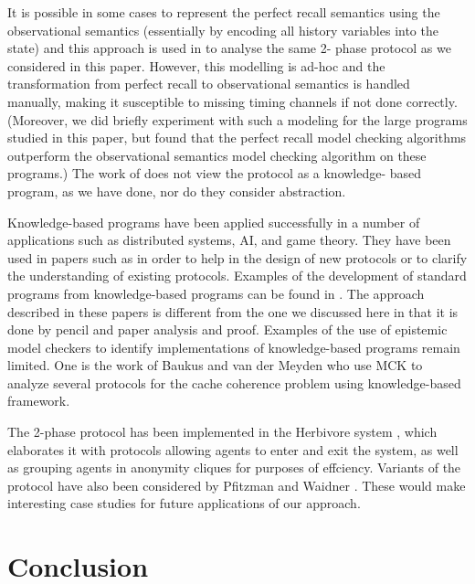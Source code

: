 \documentclass[]{llncs}
\begin{document}
It is possible in some cases to represent the perfect
recall semantics using the observational semantics (essentially by  
encoding all history variables into the
state) and this approach is used in \cite{LSGWY} to analyse the same 2- 
phase protocol as
we considered in this paper.
However, this modelling is ad-hoc and the transformation from perfect  
 recall to observational semantics is
handled manually, making it susceptible to missing timing channels if  
not done correctly.
(Moreover, we did briefly experiment with such a modeling for the  
large programs studied in this paper, but
found that the perfect recall model checking algorithms outperform the  
observational semantics
model checking algorithm on these programs.)
The work of \cite{LSGWY} does not view the protocol as a knowledge- 
based program, as we have done,
nor do they consider abstraction.

Knowledge-based programs have been applied successfully in a number of  
applications such as
distributed systems, AI, and game theory. They have been used in  
papers such as
\cite{DM86,Had87,HZ92,BaukusM04,NT93} in order to help in the  
design of new protocols or to clarify
the understanding of existing protocols.
Examples of the development of standard programs from knowledge-based  
programs
can be found in \cite{APPG88,DM86,SR86}.
The approach described in these papers is different from the one we  
discussed here in that it is done by pencil and paper analysis and proof.
Examples of the use of epistemic model checkers to identify  
implementations of knowledge-based programs
remain limited. One is the  work of Baukus and van der Meyden  
\cite{BaukusM04} who use MCK
to analyze several protocols for the cache coherence problem using  
knowledge-based framework.

The 2-phase protocol has been implemented in the Herbivore system  
\cite{Herbivore}, which elaborates it
with protocols allowing agents to enter and exit the system, as well  
as grouping agents in
anonymity cliques for purposes of effciency. Variants of the protocol  
have also been considered by
Pfitzman and Waidner \cite{WP}.
These would make interesting case studies for future applications of  
our approach.

\section{Conclusion}\label{sec:concl} 
\end{document}
